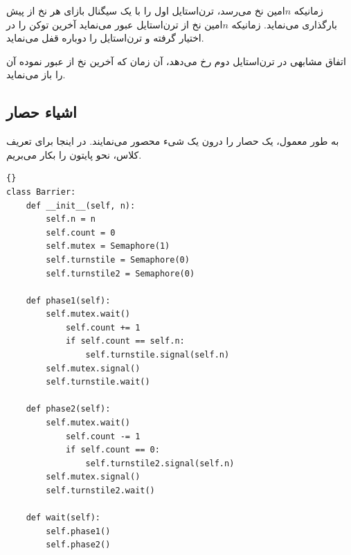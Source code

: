 \documentclass{book}
\begin{document}
    زمانیکه $n$امین نخ می‌رسد، ترن‌استایل اول را با یک سیگنال بازای هر نخ از پیش بارگذاری می‌نماید.
    زمانیکه $n$امین نخ از ترن‌استایل عبور می‌نماید آخرین توکن را در اختیار گرفته و ترن‌استایل را دوباره قفل می‌نماید. 
    

    اتفاق مشابهی در ترن‌استایل دوم  رخ می‌دهد،  آن زمان که آخرین نخ از  عبور نموده آن را باز می‌نماید. 


\newpage
\subsection {اشیاء حصار}

    به طور معمول، یک حصار را درون یک شیء محصور می‌نمایند. 
    در اینجا برای تعریف کلاس، نحو پایتون را بکار می‌بریم. 

\begin{latin}
\begin{latin}
\begin{lstlisting}[title=\rl{کلاس \lr{Barrier} }]{}
class Barrier:
    def __init__(self, n):
        self.n = n
        self.count = 0
        self.mutex = Semaphore(1)
        self.turnstile = Semaphore(0)
        self.turnstile2 = Semaphore(0)

    def phase1(self):
        self.mutex.wait()
            self.count += 1
            if self.count == self.n:
                self.turnstile.signal(self.n) 
        self.mutex.signal()
        self.turnstile.wait()            

    def phase2(self):
        self.mutex.wait()
            self.count -= 1
            if self.count == 0:
                self.turnstile2.signal(self.n)
        self.mutex.signal()
        self.turnstile2.wait()

    def wait(self):
        self.phase1()
        self.phase2()
\end{lstlisting}
\end{latin}
\end{latin}
\end{document}

